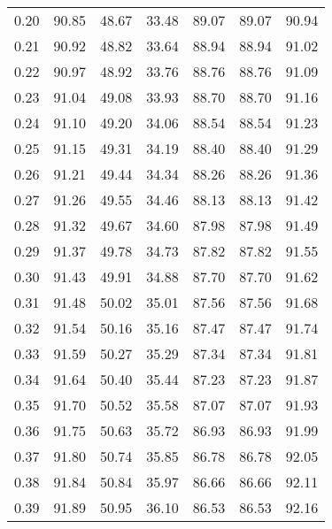 \begin{tabular}{|c|c|c|c|c|c|c|}
      0.20 &     90.85 &     48.67 &      33.48 &   89.07 &      89.07 &         90.94 \\
      0.21 &     90.92 &     48.82 &      33.64 &   88.94 &      88.94 &         91.02 \\
      0.22 &     90.97 &     48.92 &      33.76 &   88.76 &      88.76 &         91.09 \\
      0.23 &     91.04 &     49.08 &      33.93 &   88.70 &      88.70 &         91.16 \\
      0.24 &     91.10 &     49.20 &      34.06 &   88.54 &      88.54 &         91.23 \\
      0.25 &     91.15 &     49.31 &      34.19 &   88.40 &      88.40 &         91.29 \\
      0.26 &     91.21 &     49.44 &      34.34 &   88.26 &      88.26 &         91.36 \\
      0.27 &     91.26 &     49.55 &      34.46 &   88.13 &      88.13 &         91.42 \\
      0.28 &     91.32 &     49.67 &      34.60 &   87.98 &      87.98 &         91.49 \\
      0.29 &     91.37 &     49.78 &      34.73 &   87.82 &      87.82 &         91.55 \\
      0.30 &     91.43 &     49.91 &      34.88 &   87.70 &      87.70 &         91.62 \\
      0.31 &     91.48 &     50.02 &      35.01 &   87.56 &      87.56 &         91.68 \\
      0.32 &     91.54 &     50.16 &      35.16 &   87.47 &      87.47 &         91.74 \\
      0.33 &     91.59 &     50.27 &      35.29 &   87.34 &      87.34 &         91.81 \\
      0.34 &     91.64 &     50.40 &      35.44 &   87.23 &      87.23 &         91.87 \\
      0.35 &     91.70 &     50.52 &      35.58 &   87.07 &      87.07 &         91.93 \\
      0.36 &     91.75 &     50.63 &      35.72 &   86.93 &      86.93 &         91.99 \\
      0.37 &     91.80 &     50.74 &      35.85 &   86.78 &      86.78 &         92.05 \\
      0.38 &     91.84 &     50.84 &      35.97 &   86.66 &      86.66 &         92.11 \\
      0.39 &     91.89 &     50.95 &      36.10 &   86.53 &      86.53 &         92.16 \\

\end{tabular}
